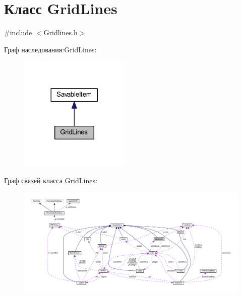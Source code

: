 \hypertarget{class_grid_lines}{\section{Класс Grid\-Lines}
\label{class_grid_lines}
}


{\ttfamily \#include $<$Gridlines.\-h$>$}



Граф наследования\-:Grid\-Lines\-:
\nopagebreak
\begin{figure}[H]
\begin{center}
\leavevmode
\includegraphics[width=149pt]{class_grid_lines__inherit__graph}
\end{center}
\end{figure}


Граф связей класса Grid\-Lines\-:
\nopagebreak
\begin{figure}[H]
\begin{center}
\leavevmode
\includegraphics[width=350pt]{class_grid_lines__coll__graph}
\end{center}
\end{figure}
